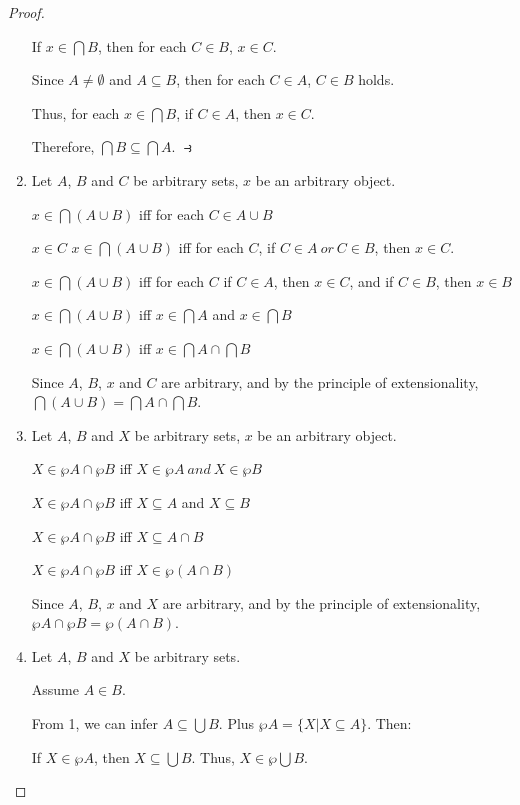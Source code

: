 \documentclass[12pt,a4paper,utf8]{article}
\theoremstyle{plain}
\begin{document}
\begin{proof}
\begin{enumerate}
    If $x \in \bigcap B$, then for each $C \in B$, $x \in C$. 
    
    Since $A \neq \emptyset$ and $A \subseteq B$, then for each $C \in A$, $C \in B$ holds. 
    
    Thus, for each $x \in \bigcap B$, if $C \in A$, then $x \in C$. 
    
    Therefore, $\bigcap B \subseteq \bigcap A$. $ \strictif $
    
    \item 
    Let $A$, $B$ and $C$ be arbitrary sets, $x$ be an arbitrary object. 
    
    $x \in \bigcap (A \cup B)$ iff for each $C \in A \cup B$
    
    $x \in C$ $x \in \bigcap (A \cup B)$ iff for each $C$, if $C \in A\ or\ C \in B$, then $x \in C$.
    
    $x \in \bigcap (A \cup B)$ iff for each $C$ if $C \in A$, then $x \in C$, and if $C \in B$, then $x \in B$
    
    $x \in \bigcap (A \cup B)$ iff $x \in \bigcap A$ and $x \in \bigcap B$
    
    $x \in \bigcap (A \cup B)$ iff $x \in \bigcap A \cap \bigcap B$
    
    Since $A$, $B$, $x$ and $C$ are arbitrary, and by the principle of extensionality, $\bigcap (A \cup B) = \bigcap A \cap \bigcap B$.
    
    \item
    Let $A$, $B$ and $X$ be arbitrary sets, $x$ be an arbitrary object.
    
    $X \in \wp A \cap \wp B$ iff $X \in \wp A\ and\ X \in \wp B$
    
    $X \in \wp A \cap \wp B$ iff $X \subseteq A$ and $X \subseteq B$
    
    $X \in \wp A \cap \wp B$ iff $X \subseteq A \cap B$
    
    $X \in \wp A \cap \wp B$ iff $X \in \wp (A \cap B)$
    
    Since $A$, $B$, $x$ and $X$ are arbitrary, and by the principle of extensionality, $\wp A \cap \wp B = \wp (A \cap B)$.
    
    \item
    Let $A$, $B$ and $X$ be arbitrary sets.
    
    Assume $A \in B$.
    
    From 1, we can infer $A \subseteq \bigcup B$. 
    Plus $\wp A = \{ X \vert X \subseteq A\}$. Then:
    
    If $X \in \wp A$, then $X \subseteq \bigcup B$. Thus, $X \in \wp \bigcup B$.
    

\end{enumerate}
\end{proof}
\end{document}
